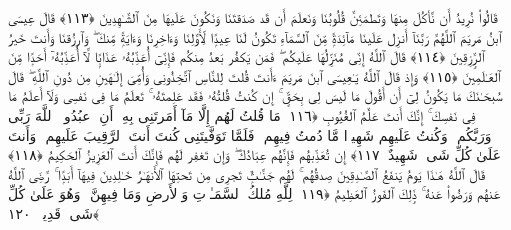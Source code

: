  قَالُوا۟ نُرِيدُ أَن نَّأكُلَ مِنهَا وَتَطمَئِنَّ قُلُوبُنَا وَنَعلَمَ أَن قَد صَدَقتَنَا وَنَكُونَ عَلَيهَا مِنَ ٱلشَّـٰهِدِينَ ﴿١١٣﴾
 قَالَ عِيسَى ٱبنُ مَريَمَ ٱللَّهُمَّ رَبَّنَآ أَنزِل عَلَينَا مَآئِدَةًۭ مِّنَ ٱلسَّمَآءِ تَكُونُ لَنَا عِيدًۭا لِّأَوَّلِنَا وَءَاخِرِنَا وَءَايَةًۭ مِّنكَ ۖ وَٱرزُقنَا وَأَنتَ خَيرُ ٱلرَّٟزِقِينَ ﴿١١٤﴾
 قَالَ ٱللَّهُ إِنِّى مُنَزِّلُهَا عَلَيكُم ۖ فَمَن يَكفُر بَعدُ مِنكُم فَإِنِّىٓ أُعَذِّبُهُۥ عَذَابًۭا لَّآ أُعَذِّبُهُۥٓ أَحَدًۭا مِّنَ ٱلعَـٰلَمِينَ ﴿١١٥﴾
 وَإِذ قَالَ ٱللَّهُ يَـٰعِيسَى ٱبنَ مَريَمَ ءَأَنتَ قُلتَ لِلنَّاسِ ٱتَّخِذُونِى وَأُمِّىَ إِلَـٰهَينِ مِن دُونِ ٱللَّهِ ۖ قَالَ سُبحَـٰنَكَ مَا يَكُونُ لِىٓ أَن أَقُولَ مَا لَيسَ لِى بِحَقٍّ ۚ إِن كُنتُ قُلتُهُۥ فَقَد عَلِمتَهُۥ ۚ تَعلَمُ مَا فِى نَفسِى وَلَآ أَعلَمُ مَا فِى نَفسِكَ ۚ إِنَّكَ أَنتَ عَلَّٰمُ ٱلغُيُوبِ ﴿١١٦﴾
 مَا قُلتُ لَهُم إِلَّا مَآ أَمَرتَنِى بِهِۦٓ أَنِ ٱعبُدُوا۟ ٱللَّهَ رَبِّى وَرَبَّكُم ۚ وَكُنتُ عَلَيهِم شَهِيدًۭا مَّا دُمتُ فِيهِم ۖ فَلَمَّا تَوَفَّيتَنِى كُنتَ أَنتَ ٱلرَّقِيبَ عَلَيهِم ۚ وَأَنتَ عَلَىٰ كُلِّ شَىءٍۢ شَهِيدٌ ﴿١١٧﴾
 إِن تُعَذِّبهُم فَإِنَّهُم عِبَادُكَ ۖ وَإِن تَغفِر لَهُم فَإِنَّكَ أَنتَ ٱلعَزِيزُ ٱلحَكِيمُ ﴿١١٨﴾
 قَالَ ٱللَّهُ هَـٰذَا يَومُ يَنفَعُ ٱلصَّـٰدِقِينَ صِدقُهُم ۚ لَهُم جَنَّـٰتٌۭ تَجرِى مِن تَحتِهَا ٱلأَنهَـٰرُ خَـٰلِدِينَ فِيهَآ أَبَدًۭا ۚ رَّضِىَ ٱللَّهُ عَنهُم وَرَضُوا۟ عَنهُ ۚ ذَٟلِكَ ٱلفَوزُ ٱلعَظِيمُ ﴿١١٩﴾
 لِلَّهِ مُلكُ ٱلسَّمَـٰوَٟتِ وَٱلأَرضِ وَمَا فِيهِنَّ ۚ وَهُوَ عَلَىٰ كُلِّ شَىءٍۢ قَدِيرٌۢ ﴿١٢٠﴾
 

